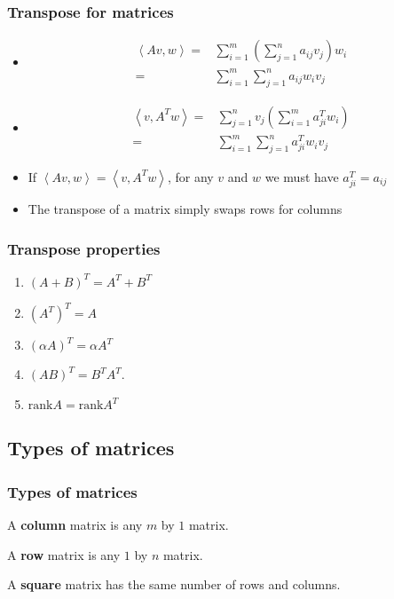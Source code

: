\documentclass[compress]{beamer}
\newcommand{\iprod}[2]{\left\langle {#1} , {#2} \right\rangle}
\newcommand{\rank}{\mathrm{rank}}
\theoremstyle{definition}
\begin{document}
\begin{frame}
  \frametitle{Transpose for matrices}
  \begin{itemize}
  \item 
    \begin{align*}
      \iprod{Av}{w} = & \sum_{i=1}^m \left(\sum_{j=1}^n a_{ij} v_j \right)
      w_i  \\
      = & \sum_{i=1}^m \sum_{j=1}^n a_{ij} w_i v_j
    \end{align*}
  \item  
    \begin{align*}
      \iprod{v}{A^T w} = & \sum_{j=1}^n v_j \left(\sum_{i=1}^m a_{ji}^T
        w_i\right) \\
      = & \sum_{i=1}^m \sum_{j=1}^n a_{ji}^T w_i v_j
    \end{align*}
  \item If $\iprod{A v}{w} = \iprod{v}{A^T w} $, for any $v$ and $w$ we must
    have $a_{ji}^T = a_{ij}$
  \item The transpose of a matrix simply swaps rows
    for columns
  \end{itemize}
\end{frame}

\begin{frame}
  \frametitle{Transpose properties}
  \begin{enumerate}
  \item $(A+B)^T = A^T + B^T$
  \item $(A^T)^T = A$
  \item $(\alpha A)^T = \alpha A^T$
  \item $(AB)^T = B^T A^T$.
  \item $\rank A = \rank A^T$
  \end{enumerate}
\end{frame}

\subsection{Types of matrices}

\begin{frame}
  \frametitle{Types of matrices}
  \begin{definition}
    A \textbf{column} matrix is any $m$ by $1$ matrix.
  \end{definition}
  
  \begin{definition}
    A \textbf{row} matrix is any $1$ by $n$ matrix.
  \end{definition}
  
  \begin{definition}
    A \textbf{square} matrix has the same number of rows and columns.
  \end{definition}
\end{frame}
\end{document}
